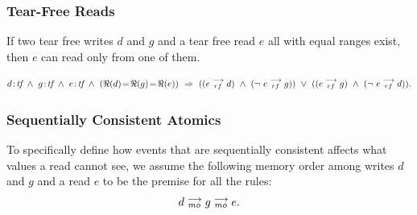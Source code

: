 
        \subsubsection{Tear-Free Reads} 
            If two tear free writes $d$ and $g$ and a tear free read $e$ all with equal ranges exist, then $e$ can read only from one of them\footnotemark.
                
            \begin{align*}
                \et{d}{tf}\ \wedge\ \et{g}{tf} \ \wedge \ \et{e}{tf} 
                  \ \wedge \ 
                  (\Re(d) \!=\! \Re(g) \!=\! \Re(e)) 
                  \ \Rightarrow{} \ 
                      ((\reln{e}{rf}{d}) 
                      \ \wedge \ 
                      (\neg \ \reln{e}{rf}{g})) 
                  \ \vee \  
                      ((\reln{e}{rf}{g}) 
                      \ \wedge \
                      (\neg \ \reln{e}{rf}{d})).
            \end{align*}
                    
            
        \subsubsection{Sequentially Consistent Atomics} 
            
            To specifically define how events that are sequentially consistent affects what values a read cannot see, we assume the following memory order among writes $d$ and $g$ and a read $e$ to be the premise for all the rules:  
                \begin{align*}
                    d \stackrel{\longrightarrow}{_{mo}} g \stackrel{\longrightarrow}{_{mo}} e.
                \end{align*}
               
